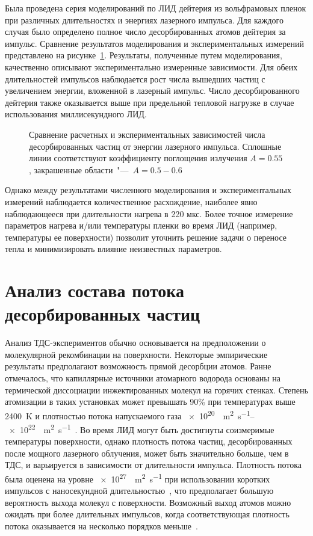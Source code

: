 Была проведена серия моделирований по ЛИД дейтерия из вольфрамовых пленок при различных длительностях и энергиях лазерного импульса. Для каждого случая было определено полное число десорбированных атомов дейтерия за импульс. Сравнение результатов моделирования и экспериментальных измерений представлено на рисунке~\cref{fig:ch4/LID_Comparison}. Результаты, полученные путем моделирования, качественно описывают экспериментально измеренные зависимости. Для обеих длительностей импульсов наблюдается рост числа вышедших частиц с увеличением энергии, вложенной в лазерный импульс. Число десорбированного дейтерия также оказывается выше при предельной тепловой нагрузке в случае использования миллисекундного ЛИД.

\begin{figure}[ht]
    \caption{Сравнение расчетных и экспериментальных зависимостей числа десорбированных частиц от энергии лазерного импульса. Сплошные линии соответствуют коэффициенту поглощения излучения \( A=0.55 \), закрашенные области~"---~\( A = 0.5-0.6 \)}\label{fig:ch4/LID_Comparison}
\end{figure}

Однако между результатами численного моделирования и экспериментальных измерений наблюдается количественное расхождение, наиболее явно наблюдающееся при длительности нагрева в 220 мкс. Более точное измерение параметров нагрева и/или температуры пленки во время ЛИД (например, температуры ее поверхности) позволит уточнить решение задачи о переносе тепла и минимизировать влияние неизвестных параметров.

\section{Анализ состава потока десорбированных частиц}\label{sec:ch4/sec2}

Анализ ТДС-экспериментов обычно основывается на предположении о молекулярной рекомбинации на поверхности. Некоторые эмпирические результаты предполагают возможность прямой десорбции атомов. Ранне отмечалось, что капиллярные источники атомарного водорода основаны на термической диссоциации инжектированных молекул на горячих стенках. Степень атомизации в таких установках может превышать 90\% при температурах выше \SI{2400}{\kelvin} и плотностью потока напускаемого газа \SIrange{e20}{e22}{\per\meter\squared\per\second}~\cite{Tschersich2000,Tschersich2008}. Во время ЛИД могут быть достигнуты соизмеримые температуры поверхности, однако плотность потока частиц, десорбированных после мощного лазерного облучения, может быть значительно больше, чем в ТДС, и варьируется в зависимости от длительности импульса. Плотность потока была оценена на уровне \SI{e27}{\per\meter\squared\per\second} при использовании коротких импульсов с наносекундной длительностью~\cite{Gasparyan2021}, что предполагает большую вероятность выхода молекул с поверхности. Возможный выход атомов можно ожидать при более длительных импульсов, когда соответствующая плотность потока оказывается на несколько порядков меньше~\cite{Yu2019}.

